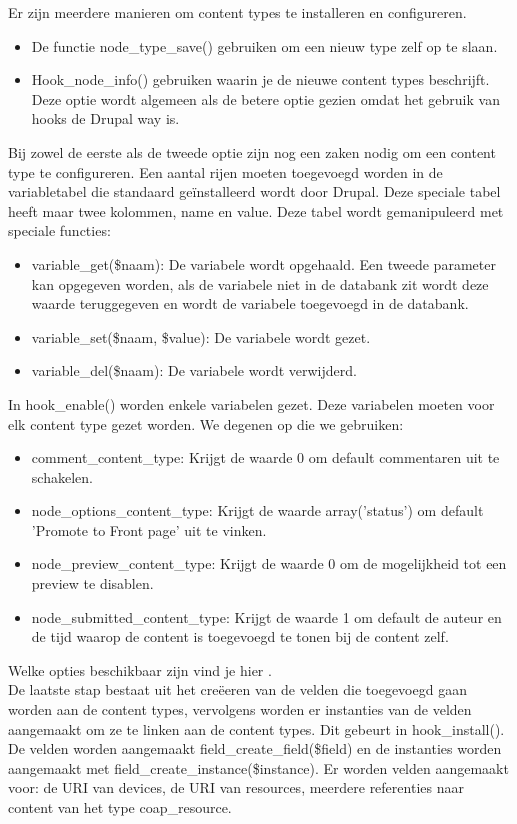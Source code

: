\noindent
Er zijn meerdere manieren om content types te installeren en configureren.
\begin{itemize}
\item De functie node\_type\_save() gebruiken om een nieuw type zelf op te slaan.
\item Hook\_node\_info() gebruiken waarin je de nieuwe content types beschrijft. Deze optie wordt algemeen als de betere optie gezien omdat het gebruik van hooks de Drupal way is.
\end{itemize}
Bij zowel de eerste als de tweede optie zijn nog een zaken nodig om een content type te configureren. Een aantal rijen moeten toegevoegd worden in de variabletabel die standaard ge\"{i}nstalleerd wordt door Drupal. Deze speciale tabel heeft maar twee kolommen, name en value. Deze tabel wordt gemanipuleerd met speciale functies:
\begin{itemize}
\item variable\_get(\$naam): De variabele wordt opgehaald. Een tweede parameter kan opgegeven worden, als de variabele niet in de databank zit wordt deze waarde teruggegeven en wordt de variabele toegevoegd in de databank.
\item variable\_set(\$naam, \$value): De variabele wordt gezet.
\item variable\_del(\$naam): De variabele wordt verwijderd.
\end{itemize}

\noindent
In hook\_enable() worden enkele variabelen gezet. Deze variabelen moeten voor elk content type gezet worden. We degenen op die we gebruiken:
\begin{itemize}
\item comment\_content\_type: Krijgt de waarde 0 om default commentaren uit te schakelen.
\item node\_options\_content\_type: Krijgt de waarde array('status') om default 'Promote to Front page' uit te vinken.
\item node\_preview\_content\_type: Krijgt de waarde 0 om de mogelijkheid tot een preview te disablen.
\item node\_submitted\_content\_type: Krijgt de waarde 1 om default de auteur en de tijd waarop de content is toegevoegd te tonen bij de content zelf.
\end{itemize}
Welke opties beschikbaar zijn vind je hier \cite{contentTypeVariables}.\\

\noindent
De laatste stap bestaat uit het cre\"{e}eren van de velden die toegevoegd gaan worden aan de content types, vervolgens worden er instanties van de velden aangemaakt om ze te linken aan de content types. Dit gebeurt in hook\_install(). De velden worden aangemaakt field\_create\_field(\$field) en de instanties worden aangemaakt met field\_create\_instance(\$instance). Er worden velden aangemaakt voor: de URI van devices, de URI van resources, meerdere referenties naar content van het type coap\_resource. %

